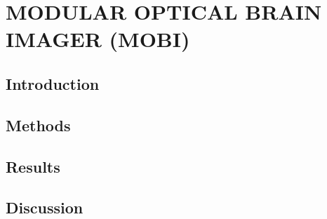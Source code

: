 
\chapter{MODULAR OPTICAL BRAIN IMAGER (MOBI)} %
\label{chap:mobi}


\section{Introduction} %
\label{chap:mobi:introduction}



\section{Methods}
\label{chap:mobi:methods}



\section{Results}
\label{chap:mobi:results}



\section{Discussion}
\label{chap:mobi:discussion}

